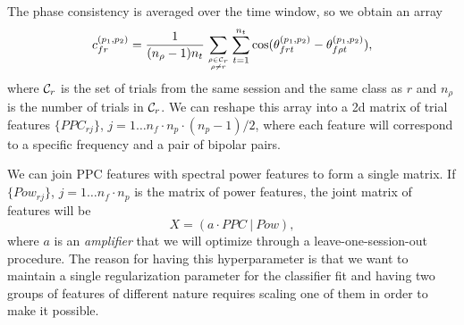 \documentclass[a4paper]{article}
\begin{document}
The phase consistency is averaged over the time window, so we obtain an array
\[ c_{fr}^{(p_1,p_2)} = \frac{1}{(n_{\rho}-1) n_t} \sum_{\rho \in {\cal C}_r \atop \rho \neq r} \sum_{t=1}^{n_t} \cos(\theta_{frt}^{(p_1,p_2)} - \theta_{f \rho t}^{(p_1,p_2)}), \]
where ${\cal C}_r$ is the set of trials from the same session and the same class as $r$ and
$n_{\rho}$ is the number of trials in ${\cal C}_r$. We can reshape this array into a 2d
matrix of trial features $\{PPC_{rj}\}$, $j=1 \ldots n_f \cdot n_p \cdot (n_p-1) / 2$,
where each feature will correspond to a specific frequency and a pair of bipolar pairs.

We can join PPC features with spectral power features to form a single matrix. If
$\{Pow_{rj}\}$, $j=1 \ldots n_f \cdot n_p$ is the matrix of power features, the
joint matrix of features will be
\begin{equation}
\label{eq:features_matrix}
X = \left(a \cdot PPC \ | \ Pow\right),
\end{equation}
where $a$ is an {\em amplifier\/} that we will optimize through a leave-one-session-out
procedure. The reason for having this hyperparameter is that we want to maintain a single
regularization parameter for the classifier fit and having two groups of features of
different nature requires scaling one of them in order to make it possible.
\end{document}
